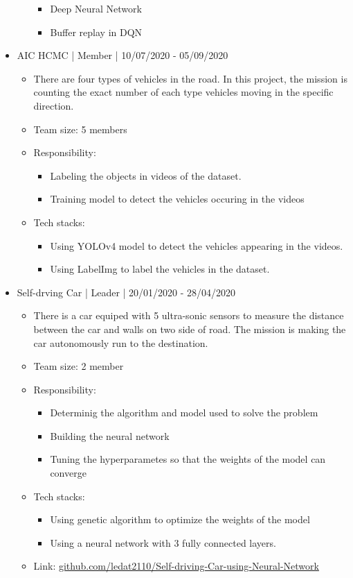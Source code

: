 \documentclass[a4paper, 12pt]{article}
\begin{document}
\begin{itemize}
\begin{itemize}
\begin{itemize}
                \item Deep Neural Network
                \item Buffer replay in DQN
            \end{itemize}
        \end{itemize}
    \item AIC HCMC | Member | 10/07/2020 - 05/09/2020
      \begin {itemize}
      \item There are four types of vehicles in the road. In this project, the mission is counting the exact number of each type vehicles moving in the specific direction.
      \item Team size: 5 members
      \item Responsibility:
        \begin{itemize}
          \item Labeling the objects in videos of the dataset.
          \item Training model to detect the vehicles occuring in the videos
        \end{itemize}
      \item Tech stacks: 
        \begin{itemize}
          \item Using YOLOv4 model to detect the vehicles appearing in the videos.
          \item Using LabelImg to label the vehicles in the dataset.
        \end{itemize}
      \end{itemize}

    \item Self-drving Car | Leader | 20/01/2020 - 28/04/2020
      \begin {itemize}
        \item There is a car equiped with 5 ultra-sonic sensors to measure the distance between the car and walls on two side of road. The mission is making the car autonomously run to the destination.
        \item Team size: 2 member
        \item Responsibility:
        \begin{itemize}
          \item Determinig the algorithm and model used to solve the problem
          \item Building the neural network
          \item Tuning the hyperparametes so that the weights of the model can converge
        \end{itemize}
        \item Tech stacks: 
        \begin{itemize}
          \item Using genetic algorithm to optimize the weights of the model
          \item Using a neural network with 3 fully connected layers.
        \end{itemize}
        \item Link: \url{github.com/ledat2110/Self-driving-Car-using-Neural-Network}
      \end{itemize}


\end{itemize}
\end{document}

